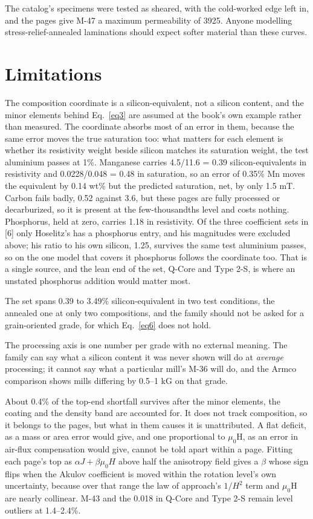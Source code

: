 \documentclass[
  11pt,
]{article}
\begin{document}
The catalog's specimens were tested as sheared, with the cold-worked edge left in, and the pages give M-47 a maximum permeability of 3925. Anyone modelling stress-relief-annealed laminations should expect softer material than these curves.

\section{Limitations}\label{limitations}

The composition coordinate is a silicon-equivalent, not a silicon content, and the minor elements behind Eq.~\eqref{eq3} are assumed at the book's own example rather than measured. The coordinate absorbs most of an error in them, because the same error moves the true saturation too: what matters for each element is whether its resistivity weight beside silicon matches its saturation weight, the test aluminium passes at 1\%. Manganese carries 4.5/11.6 = 0.39 silicon-equivalents in resistivity and 0.0228/0.048 = 0.48 in saturation, so an error of 0.35\% Mn moves the equivalent by 0.14 wt\% but the predicted saturation, net, by only 1.5 mT. Carbon fails badly, 0.52 against 3.6, but these pages are fully processed or decarburized, so it is present at the few-thousandths level and costs nothing. Phosphorus, held at zero, carries 1.18 in resistivity. Of the three coefficient sets in {[}6{]} only Hoselitz's has a phosphorus entry, and his magnitudes were excluded above; his ratio to his own silicon, 1.25, survives the same test aluminium passes, so on the one model that covers it phosphorus follows the coordinate too. That is a single source, and the lean end of the set, Q-Core and Type 2-S, is where an unstated phosphorus addition would matter most.

The set spans 0.39 to 3.49\% silicon-equivalent in two test conditions, the annealed one at only two compositions, and the family should not be asked for a grain-oriented grade, for which Eq.~\eqref{eq6} does not hold.

The processing axis is one number per grade with no external meaning. The family can say what a silicon content it was never shown will do at \emph{average} processing; it cannot say what a particular mill's M-36 will do, and the Armco comparison shows mills differing by 0.5--1 kG on that grade.

About 0.4\% of the top-end shortfall survives after the minor elements, the coating and the density band are accounted for. It does not track composition, so it belongs to the pages, but what in them causes it is unattributed. A flat deficit, as a mass or area error would give, and one proportional to \(\mu_0\)H, as an error in air-flux compensation would give, cannot be told apart within a page. Fitting each page's top as \(\alpha J + \beta\mu_0 H\) above half the anisotropy field gives a \(\beta\) whose sign flips when the Akulov coefficient is moved within the rotation level's own uncertainty, because over that range the law of approach's \(1/H^{2}\) term and \(\mu_0\)H are nearly collinear. M-43 and the 0.018 in Q-Core and Type 2-S remain level outliers at 1.4--2.4\%.
\end{document}
